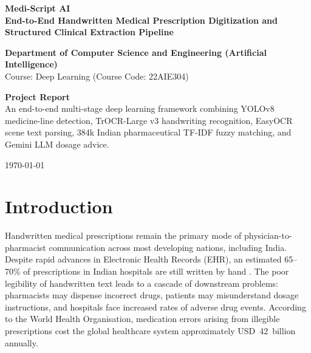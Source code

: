 \documentclass[12pt,a4paper,oneside]{report}
\begin{document}
\begin{titlepage}
\centering
\vspace*{1cm}
{\Huge \bfseries \color{navy} Medi-Script AI \\[0.4cm]}
{\Large \bfseries End-to-End Handwritten Medical Prescription Digitization and Structured Clinical Extraction Pipeline \\[1.5cm]}

{\large \textbf{Department of Computer Science and Engineering (Artificial Intelligence)} \\[0.3cm]}
{\large Course: Deep Learning (Course Code: 22AIE304) \\[2cm]}

\begin{tcolorbox}[colback=lightteal,colframe=teal,arc=4mm,width=0.92\textwidth]
\centering \large
\textbf{Project Report} \\[0.25cm]
\normalsize An end-to-end multi-stage deep learning framework combining YOLOv8 medicine-line detection, TrOCR-Large v3 handwriting recognition, EasyOCR scene text parsing, 384k Indian pharmaceutical TF-IDF fuzzy matching, and Gemini LLM dosage advice.
\end{tcolorbox}

\vfill
{\large \today \\[1cm]}
\end{titlepage}

\tableofcontents
\newpage
\listoffigures
\listoftables
\newpage

\chapter{Introduction}

Handwritten medical prescriptions remain the primary mode of physician-to-pharmacist communication across most developing nations, including India. Despite rapid advances in Electronic Health Records (EHR), an estimated 65--70\% of prescriptions in Indian hospitals are still written by hand \cite{who_medication_errors}. The poor legibility of handwritten text leads to a cascade of downstream problems: pharmacists may dispense incorrect drugs, patients may misunderstand dosage instructions, and hospitals face increased rates of adverse drug events. According to the World Health Organisation, medication errors arising from illegible prescriptions cost the global healthcare system approximately USD~42~billion annually.
\end{document}
